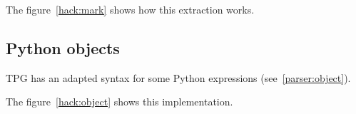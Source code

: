 The figure~\ref{hack:mark} shows how this extraction works.


\subsection{Python objects}

TPG has an adapted syntax for some Python expressions (see~\ref{parser:object}).

The figure~\ref{hack:object} shows this implementation.



